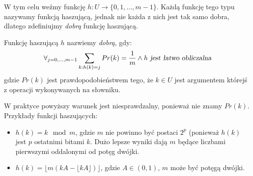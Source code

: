 W tym celu weźmy funkcję $h : U \rightarrow \{0, 1, \dots, m - 1\}$. Każdą funkcję tego typu nazywamy funkcją haszującą, jednak nie każda z nich jest tak samo dobra, dlatego zdefiniujmy \textit{dobrą} funkcję haszującą.
\begin{definition}
Funkcję haszującą $h$ nazwiemy \textit{dobrą}, gdy:
\begin{equation*}
\forall_{j = 0, \dots, m - 1} \sum_{k : h(k) = j} Pr(k) = \dfrac{1}{m} \wedge h \textsl{ jest łatwo obliczalna}
\end{equation*}
gdzie $Pr(k)$ jest prawdopodobieństwem tego, że $k \in U$ jest argumentem którejś z operacji wykonywanych na słowniku.
\end{definition}
W praktyce powyższy warunek jest niesprawdzalny, ponieważ nie znamy $Pr(k)$.
Przykłady funkcji haszujących:
\begin{itemize}
	\item $h(k) = k \mod m$, gdzie $m$ nie powinno być postaci $2^p$ (ponieważ $h(k)$ jest $p$ ostatnimi bitami $k$. Dużo lepsze wyniki dają $m$ będące liczbami pierwszymi oddalonymi od potęg dwójki.
	\item $h(k) = \lfloor m(kA - \lfloor kA \rfloor) \rfloor$, gdzie $A \in (0, 1)$, $m$ może być potęgą dwójki.
\end{itemize}
